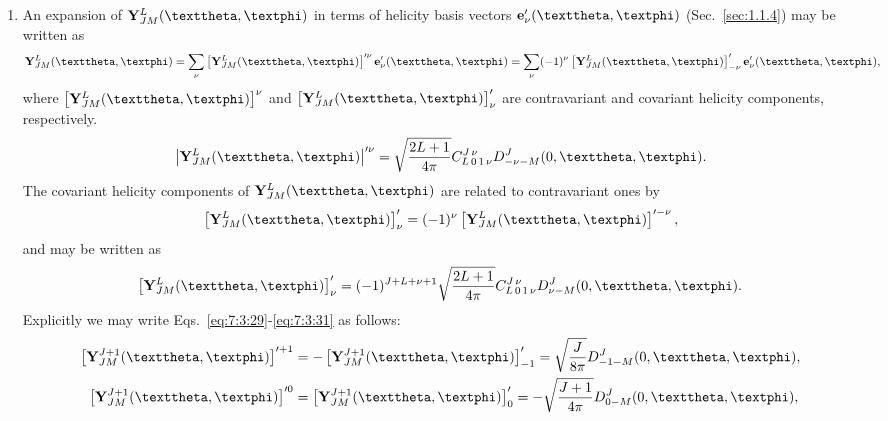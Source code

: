 \begin{enumerate}[label=(\alph*)]
\begin{fleqn}
\begin{align}
& {\left[\vect{Y}_{J M}^{(-1)}(\vartheta, \varphi)\right]_{\vartheta}=0}, \label{eq:7:3:27}\\
& {\left[\vect{Y}_{J M}^{(-1)}(\vartheta, \varphi)\right]_{\varphi}=0}. \notag
\end{align}
\end{fleqn}
\item An expansion of $\vect{Y}_{J M}^{L}(\vartheta, \varphi)$ in terms of helicity basis vectors $\vect{e}_{\nu}^{\prime}(\vartheta, \varphi)$ (Sec.~\ref{sec:1.1.4}) may be written as
\begin{equation}
\vect{Y}_{J M}^{L}(\vartheta, \varphi)=\sum_{\nu}\left[\vect{Y}_{J M}^{L}(\vartheta, \varphi)\right]^{\prime\nu} \vect{e}_{\nu}^{\prime}(\vartheta, \varphi)=\sum_{\nu}(-1)^{\nu}\left[\vect{Y}_{J M}^{L}(\vartheta, \varphi)\right]_{-\nu}^{\prime} \vect{e}_{\nu}^{\prime}(\vartheta, \varphi), \label{eq:7:3:28}
\end{equation}
where $\left[\vect{Y}_{J M}^{L}(\vartheta, \varphi)\right]^{\nu}$ and $\left[\vect{Y}_{J M}^{L}(\vartheta, \varphi)\right]_{\nu}^{\prime}$ are contravariant and covariant helicity components, respectively.
\begin{equation}
\left|\vect{Y}_{J M}^{L}(\vartheta, \varphi)\right|^{\prime \nu}=\sqrt{\frac{2 L+1}{4 \pi}} \clebsch{L}{0}{1}{\nu}{J}{\nu} D_{-\nu-M}^{J}(0, \vartheta, \varphi). \label{eq:7:3:29}
\end{equation}
The covariant helicity components of $\vect{Y}_{J M}^{L}(\vartheta, \varphi)$ are related to contravariant ones by
\begin{equation}
\left[\vect{Y}_{J M}^{L}(\vartheta, \varphi)\right]_{\nu}^{\prime}=(-1)^{\nu}\left[\vect{Y}_{J M}^{L}(\vartheta, \varphi)\right]^{\prime-\nu}, \label{eq:7:3:30}
\end{equation}
and may be written as
\begin{equation}
\left[\vect{Y}_{J M}^{L}(\vartheta, \varphi)\right]_{\nu}^{\prime}=(-1)^{J+L+\nu+1} \sqrt{\frac{2 L+1}{4 \pi}} \clebsch{L}{0}{1}{\nu}{J}{\nu} D_{\nu-M}^{J}(0, \vartheta, \varphi) . \label{eq:7:3:31}
\end{equation}
Explicitly we may write Eqs.~\eqref{eq:7:3:29}-\eqref{eq:7:3:31} as follows:
\begin{align}
\left[\vect{Y}_{J M}^{J+1}(\vartheta, \varphi)\right]^{\prime+1}&=-\left[\vect{Y}_{J M}^{J+1}(\vartheta, \varphi)\right]_{-1}^{\prime}=\sqrt{\frac{J}{8 \pi}} D_{-1-M}^{J}(0, \vartheta, \varphi), \notag\\
\left[\vect{Y}_{J M}^{J+1}(\vartheta, \varphi)\right]^{\prime 0}&=\left[\vect{Y}_{J M}^{J+1}(\vartheta, \varphi)\right]_{0}^{\prime}=-\sqrt{\frac{J+1}{4 \pi}} D_{0-M}^{J}(0, \vartheta, \varphi), \label{eq:7:3:32}\\

\end{align}
\end{enumerate}
